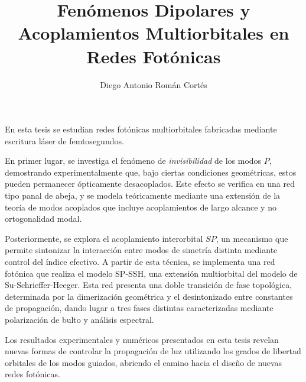 \documentclass[hyphens]{umemoria}
\author{Diego Antonio Román Cortés}
\title{Fenómenos Dipolares y Acoplamientos Multiorbitales en Redes Fotónicas}
\begin{document}
\frontmatter
\maketitle

\begin{resumen}
	\noindent En esta tesis se estudian redes fotónicas multiorbitales fabricadas mediante escritura láser de femtosegundos. 
	
	En primer lugar, se investiga el fenómeno de \textit{invisibilidad} de los modos \( P \), demostrando experimentalmente que, bajo ciertas condiciones geométricas, estos pueden permanecer ópticamente desacoplados. Este efecto se verifica en una red tipo panal de abeja, y se modela teóricamente mediante una extensión de la teoría de modos acoplados que incluye acoplamientos de largo alcance y no ortogonalidad modal.
	 
	 Posteriormente, se explora el acoplamiento interorbital \( SP \), un mecanismo que permite sintonizar la interacción entre modos de simetría distinta mediante control del índice efectivo. A partir de esta técnica, se implementa una red fotónica que realiza el modelo SP-SSH, una extensión multiorbital del modelo de Su-Schrieffer-Heeger. Esta red presenta una doble transición de fase topológica, determinada por la dimerización geométrica y el desintonizado entre constantes de propagación, dando lugar a tres fases distintas caracterizadas mediante polarización de bulto y análisis espectral.
	  
	Los resultados experimentales y numéricos presentados en esta tesis revelan nuevas formas de controlar la propagación de luz utilizando los grados de libertad orbitales de los modos guiados, abriendo el camino hacia el diseño de nuevas redes fotónicas.
\end{resumen}

\end{document}
